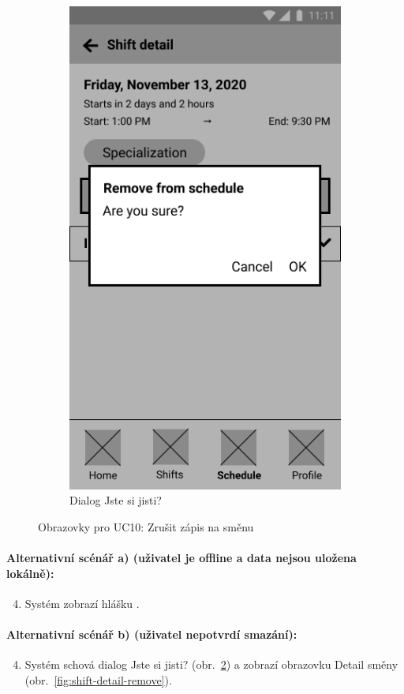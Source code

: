 \documentclass[twoside]{ctuthesis}
\begin{document}
\begin{figure}[h!]
\begin{subfigure}{.45\textwidth}
		\includegraphics[scale=.35]{img/shift-detail-remove-confirm.png}
		\caption{Dialog Jste si jisti?}
		\label{fig:shift-remove-confirm}
	\end{subfigure}
	\caption{Obrazovky pro UC10: Zrušit zápis na směnu}
\end{figure}


\paragraph{Alternativní scénář a) (uživatel je offline a data nejsou uložena lokálně):}
\begin{enumerate}[label=\arabic*a]
	\setcounter{enumi}{3}
	\item Systém zobrazí hlášku .
\end{enumerate}

\paragraph{Alternativní scénář b) (uživatel nepotvrdí smazání):}
\begin{enumerate}[label=\arabic*b]
	\setcounter{enumi}{3}
	\item Systém schová dialog Jste si jisti? (obr.~\ref{fig:shift-remove-confirm}) a zobrazí obrazovku Detail směny (obr.~\ref{fig:shift-detail-remove}).
\end{enumerate}
\end{document}
